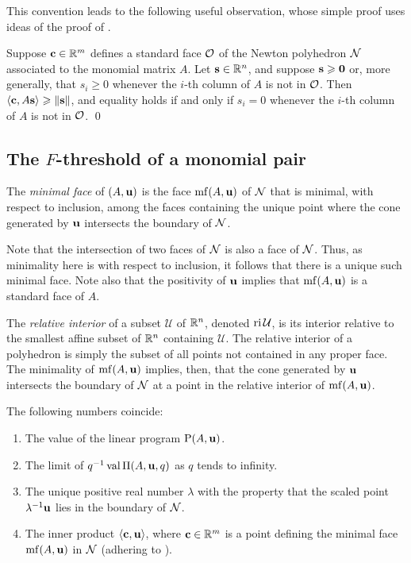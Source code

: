 \documentclass{amsart}
\begin{document}
This convention leads to the following useful observation, whose simple proof uses ideas of the proof of .

\begin{proposition}\label{prop: inner product with columns of A}
   Suppose $\mathbf{c} \in \mathbb{R}^m$ defines a standard face $\mathcal{O}$ of the Newton polyhedron $\mathcal{N}$ associated to the monomial matrix $A$.
   Let $\mathbf{s} \in \mathbb{R}^n$, and suppose $\mathbf{s} \geqslant \mathbf{0}$ or, more generally, that $s_i \ge 0$ whenever the $i$-th column of $A$ is not in $\mathcal{O}$.
   Then $\langle \mathbf{c}, A\mathbf{s} \rangle \geqslant \| \mathbf{s} \|$, and equality holds if and only if $s_i = 0$ whenever the $i$-th column of $A$ is not in $\mathcal{O}$.
   \qed
\end{proposition}

\subsection{The $F$-threshold of a monomial pair}

\begin{definition}
   The \emph{minimal face} of $(A, \mathbf{u})$ is the face $\operatorname{mf}(A, \mathbf{u})$ of $\mathcal{N}$ that is minimal, with respect to inclusion, among the faces containing the unique point where the cone generated by $\mathbf{u}$ intersects the boundary of $\mathcal{N}$.
\end{definition}

Note that the intersection of two faces of $\mathcal{N}$ is also a face of $\mathcal{N}$.
Thus, as minimality here is with respect to inclusion, it follows that there is a unique such minimal face.
Note also that the positivity of $\mathbf{u}$ implies that $\operatorname{mf}(A,\mathbf{u})$ is a standard face of $A$.

The \emph{relative interior} of a subset $\mathcal{U}$ of $\mathbb{R}^n$, denoted $\operatorname{ri} \mathcal{U}$, is its interior relative to the smallest affine subset of $\mathbb{R}^n$ containing $\mathcal{U}$.
The relative interior of a polyhedron is simply the subset of all points not contained in any proper face.
The minimality of $\operatorname{mf}(A,\mathbf{u})$ implies, then, that the cone generated by $\mathbf{u}$ intersects the boundary of $\mathcal{N}$ at a point in the relative interior of $\operatorname{mf}(A,\mathbf{u})$.

\begin{proposition}
   \label{FT descriptions: P}
   The following numbers coincide\textup:
   \begin{enumerate}[$(1)$]
      \item\label{value} The value of the linear program $\mathrm{P}(A, \mathbf{u})$.
      \item\label{limit} The limit of $q^{-1}\operatorname{val} \Pi(A,\mathbf{u},q)$ as $q$ tends to infinity.
      \item\label{lambda} The unique positive real number $\lambda$ with the property that the scaled point $\lambda^{-1}\mathbf{u}$ lies in the boundary of $\mathcal{N}$.
      \item\label{new ip} The inner product $\langle \mathbf{c}, \mathbf{u} \rangle$, where $\mathbf{c} \in \mathbb{R}^m$ is a point defining the minimal face $\operatorname{mf}(A, \mathbf{u})$ in $\mathcal{N}$ \textup(adhering to \textup).
   \end{enumerate}
\end{proposition}
\end{document}
